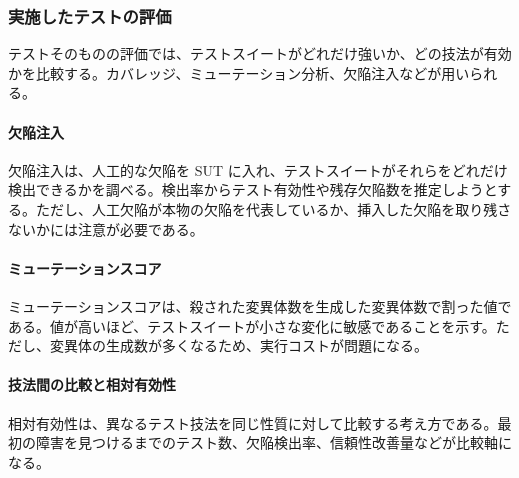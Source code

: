 \subsubsection{実施したテストの評価}
テストそのものの評価では、テストスイートがどれだけ強いか、どの技法が有効かを比較する。カバレッジ、ミューテーション分析、欠陥注入などが用いられる。

\paragraph{欠陥注入}
欠陥注入は、人工的な欠陥を SUT に入れ、テストスイートがそれらをどれだけ検出できるかを調べる。検出率からテスト有効性や残存欠陥数を推定しようとする。ただし、人工欠陥が本物の欠陥を代表しているか、挿入した欠陥を取り残さないかには注意が必要である。

\paragraph{ミューテーションスコア}
ミューテーションスコアは、殺された変異体数を生成した変異体数で割った値である。値が高いほど、テストスイートが小さな変化に敏感であることを示す。ただし、変異体の生成数が多くなるため、実行コストが問題になる。

\paragraph{技法間の比較と相対有効性}
相対有効性は、異なるテスト技法を同じ性質に対して比較する考え方である。最初の障害を見つけるまでのテスト数、欠陥検出率、信頼性改善量などが比較軸になる。
